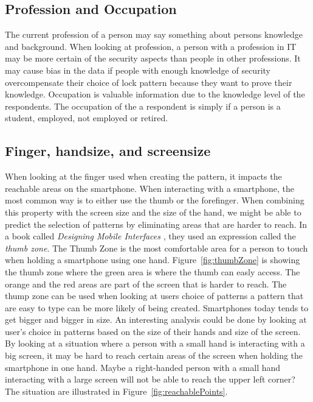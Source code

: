       \subsection*{Profession and Occupation}
      The current profession of a person may say something about persons knowledge and background. When looking at profession, a person with a profession in IT may be more certain of the security aspects than people in other professions. It may cause bias in the data if people with enough knowledge of security overcompensate their choice of lock pattern because they want to prove their knowledge. Occupation is valuable information due to the knowledge level of the respondents. The occupation of the a respondent is simply if a person is a student, employed, not employed or retired.

      \clearpage
      \subsection*{Finger, handsize, and screensize}
      When looking at the finger used when creating the pattern, it impacts the reachable areas on the smartphone. When interacting with a smartphone, the most common way is to either use the thumb or the forefinger. When combining this property with the screen size and the size of the hand, we might be able to predict the selection of patterns by eliminating areas that are harder to reach. In a book called {\it Designing Mobile Interfaces} \cite{Hoober}, they used an expression called the {\it thumb zone}. The Thumb Zone is the most comfortable area for a person to touch when holding a smartphone using one hand. Figure~\ref{fig:thumbZone} is showing the thumb zone where the green area is where the thumb can easly access. The orange and the red areas are part of the screen that is harder to reach. The thump zone can be used when looking at users choice of patterns a pattern that are easy to type can be more likely of being created. Smartphones today tends to get bigger and bigger in size. An interesting analysis could be done by looking at user's choice in patterns based on the size of their hands and size of the screen. By looking at a situation where a person with a small hand is interacting with a big screen, it may be hard to reach certain areas of the screen when holding the smartphone in one hand. Maybe a right-handed person with a small hand interacting with a large screen will not be able to reach the upper left corner? The situation are illustrated in Figure~\ref{fig:reachablePoints}.

